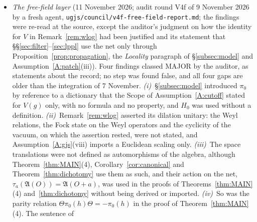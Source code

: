 \documentclass[11pt,a4paper]{article}
\theoremstyle{plain}
\theoremstyle{definition}
\theoremstyle{plain}
\theoremstyle{definition}
\newcommand{\A}{\mathfrak{A}}
\DeclareMathOperator{\supp}{supp}
\begin{document}
\begin{itemize}
record; no step false); repaired by the Wick-power paragraphs of Assumptions~\ref{A:cutoff}
and~\ref{A:stability} and
Lemma~\ref{aux:notation-ident}; the affiliation of $V(h)$ with the local algebras, asserted
in \S\ref{subsec:model} without an argument, is now proved there (\emph{Locality}), for
every bounded open set containing $\supp h$; the hypothesis of Lemma~\ref{lem:cluster} on its
unbounded argument is restated to match, and the locality of the net, used before without
being listed, is listed as Assumption~\ref{A:patch}(iii), with $\A(O)$ generated by
$W(f,0)$ and $W(0,h)$, which generate the algebra that the sources define through the bounded
functions of the smeared fields (\S\ref{subsec:model}).  Also:
A8(vii$'$)(a) transcribed (1.1.11) with ``$O(1)$'' where p.~594 prints ``0(1)'' with a digit
zero; it now transcribes it as printed, marked [sic];
Lemma~\ref{lem:transfer}'s misprint ``le'' for $\le$ is gone with its replaced proof.
\item \emph{The free-field layer} (11 November 2026; audit round V4f of 9 November 2026 by a
fresh agent, \texttt{ugjs/council/v4f-free-field-report.md}; the findings were re-read at the
source, except the auditor's judgment on how the identity for $V$ in Remark~\ref{rem:wlog} had
been justified and its statement that \S\S\ref{sec:filter}--\ref{sec:lppl} use the net only
through Proposition~\ref{prop:propagation}, the \emph{Locality} paragraph of
\S\ref{subsec:model} and Assumption~\ref{A:patch}(iii)).  Four findings classed MAJOR by the auditor, as statements about the record; no step
was found false, and all four gaps are older than the integration of 7 November.
\emph{(i)}~\S\ref{subsec:model} introduced $\pi_0$ by reference to a dictionary that the Scope
of Assumption~\ref{A:cutoff} stated for $V(g)$ only, with no formula and no property, and
$H_0$ was used without a definition.  \emph{(ii)}~Remark~\ref{rem:wlog} asserted its dilation
unitary: the Weyl relations, the Fock state on the Weyl operators and the cyclicity of the
vacuum, on which the assertion rested, were not stated, and
Assumption~\ref{A:gjs}(viii) imports a Euclidean scaling only.  \emph{(iii)}~The space translations were not defined as automorphisms of the algebra, although
Theorem~\ref{thm:MAIN}(4), Corollary~\ref{cor:canonical} and Theorem~\ref{thm:dichotomy} use
them as such, and their action on the net, $\tau_a(\A(O))=\A(O+a)$, was used in the proofs of
Theorems~\ref{thm:MAIN}(4) and~\ref{thm:dichotomy} without being derived or imported.  \emph{(iv)}~So was the parity relation
$\Theta\pi_0(h)\Theta=-\pi_0(h)$ in the proof of Theorem~\ref{thm:MAIN}(4).  The sentence of

\end{itemize}
\end{document}
